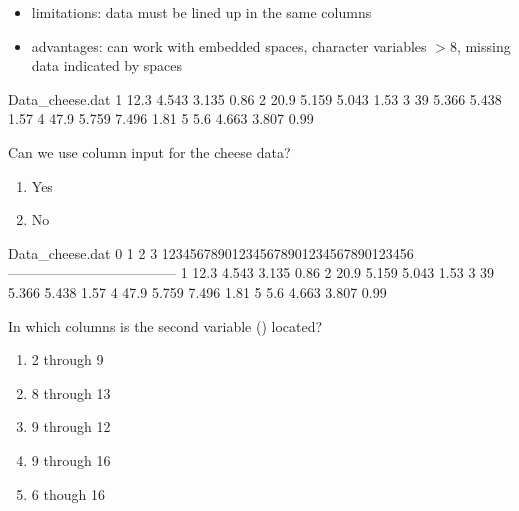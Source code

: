 \begin{frame}[fragile]
\begin{itemize}
\item limitations: data must be lined up in the same columns
\item advantages: can work with embedded spaces, character variables $>8$, missing data indicated by spaces
\end{itemize}
\vskip5pt
\footnotesize
\begin{craw}{.0}{Data\_cheese.dat}
1       12.3    4.543   3.135   0.86
2       20.9    5.159   5.043   1.53
3       39      5.366   5.438   1.57
4       47.9    5.759   7.496   1.81
5       5.6     4.663   3.807   0.99
\end{craw}
\emp
{} \hspace{0.05in}\emp
{}
\begin{clicker}{Can we use column input for the cheese data?}
\begin{enumerate}
\item Yes
\item No
\end{enumerate}
\end{clicker}
\emp
\end{frame}

\begin{frame}[fragile]
\footnotesize
\begin{craw}{.0}{Data\_cheese.dat}
0        1         2         3
123456789012345678901234567890123456
------------------------------------
1       12.3    4.543   3.135   0.86
2       20.9    5.159   5.043   1.53
3       39      5.366   5.438   1.57
4       47.9    5.759   7.496   1.81
5       5.6     4.663   3.807   0.99
\end{craw}
\emp
{} \hspace{0.05in} \emp
{}
\begin{clicker}{In which columns is the second variable () located?}
\begin{enumerate}
\item 2 through 9
\item 8 through 13
\item 9 through 12
\item 9 through 16
\item 6 though 16
\end{enumerate}
\end{clicker}
\emp
\end{frame}

